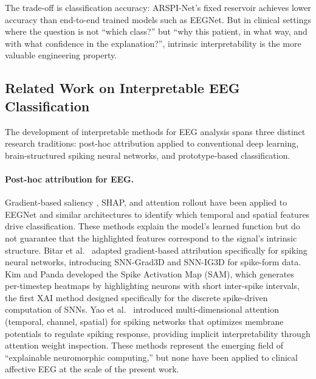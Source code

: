 The trade-off is classification accuracy: ARSPI-Net's fixed reservoir achieves lower accuracy than end-to-end trained models such as EEGNet. But in clinical settings where the question is not ``which class?'' but ``why this patient, in what way, and with what confidence in the explanation?'', intrinsic interpretability is the more valuable engineering property.

\subsection{Related Work on Interpretable EEG Classification}
\label{sec:interp_related_work}

The development of interpretable methods for EEG analysis spans three distinct research traditions: post-hoc attribution applied to conventional deep learning, brain-structured spiking neural networks, and prototype-based classification.

\paragraph{Post-hoc attribution for EEG.} Gradient-based saliency \cite{shrikumar_deeplift_2017}, SHAP, and attention rollout have been applied to EEGNet and similar architectures to identify which temporal and spatial features drive classification. These methods explain the model's learned function but do not guarantee that the highlighted features correspond to the signal's intrinsic structure. Bitar et al.\ \cite{bitar_snn_grad_2023} adapted gradient-based attribution specifically for spiking neural networks, introducing SNN-Grad3D and SNN-IG3D for spike-form data. Kim and Panda \cite{kim_sam_2021} developed the Spike Activation Map (SAM), which generates per-timestep heatmaps by highlighting neurons with short inter-spike intervals, the first XAI method designed specifically for the discrete spike-driven computation of SNNs. Yao et al.\ \cite{yao_attention_snn_2023} introduced multi-dimensional attention (temporal, channel, spatial) for spiking networks that optimizes membrane potentials to regulate spiking response, providing implicit interpretability through attention weight inspection. These methods represent the emerging field of ``explainable neuromorphic computing,'' but none have been applied to clinical affective EEG at the scale of the present work.

